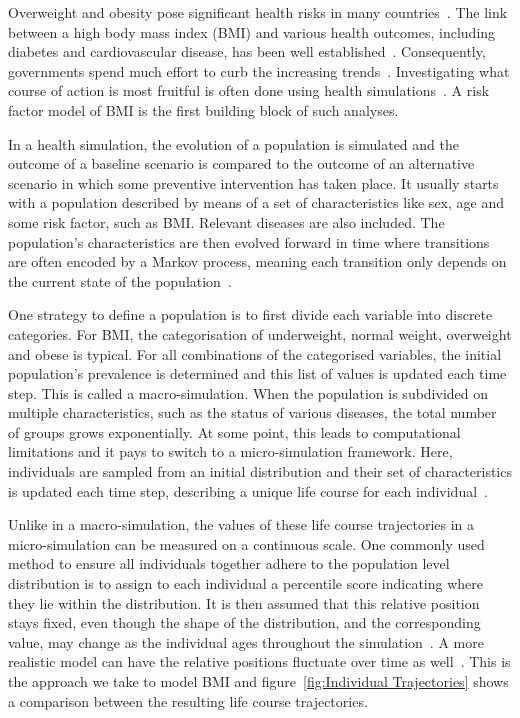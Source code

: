 \documentclass{imammb}
\numberwithin{equation}{section}
\begin{document}
Overweight and obesity pose significant health risks in many countries~\citep{Dai2020}. The link between a high body mass index (BMI) and various health outcomes, including diabetes and cardiovascular disease, has been well established~\citep{Murray2020}. Consequently, governments spend much effort to curb the increasing trends~\citep{VWS2018, VanRinsum2018}. Investigating what course of action is most fruitful is often done using health simulations~\citep{Levy2011}. A risk factor model of BMI is the first building block of such analyses.

In a health simulation, the evolution of a population is simulated and the outcome of a baseline scenario is compared to the outcome of an alternative scenario in which some preventive intervention has taken place. It usually starts with a population described by means of a set of characteristics like sex, age and some risk factor, such as BMI. Relevant diseases are also included. The population's characteristics are then evolved forward in time where transitions are often encoded by a Markov process, meaning each transition only depends on the current state of the population~\citep{Sonnenberg1993}.

One strategy to define a population is to first divide each variable into discrete categories. For BMI, the categorisation of underweight, normal weight, overweight and obese is typical. For all combinations of the categorised variables, the initial population's prevalence is determined and this list of values is updated each time step. This is called a macro-simulation. When the population is subdivided on multiple characteristics, such as the status of various diseases, the total number of groups grows exponentially. At some point, this leads to computational limitations and it pays to switch to a micro-simulation framework. Here, individuals are sampled from an initial distribution and their set of characteristics is updated each time step, describing a unique life course for each individual~\citep{Levy2011}.

Unlike in a macro-simulation, the values of these life course trajectories in a micro-simulation can be measured on a continuous scale. One commonly used method to ensure all individuals together adhere to the population level distribution is to assign to each individual a percentile score indicating where they lie within the distribution. It is then assumed that this relative position stays fixed, even though the shape of the distribution, and the corresponding value, may change as the individual ages throughout the simulation~\citep{McPherson2007, OECD2019}. A more realistic model can have the relative positions fluctuate over time as well~\citep{Vuik2021}. This is the approach we take to model BMI and figure~\ref{fig:Individual Trajectories} shows a comparison between the resulting life course trajectories.
\end{document}
